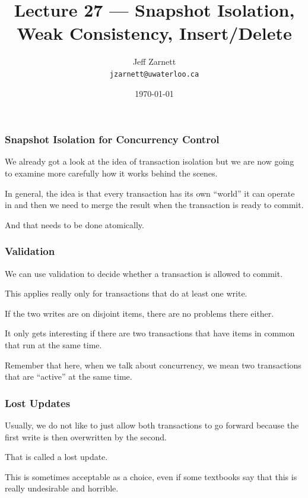 

\title{Lecture  27 --- Snapshot Isolation, Weak Consistency, Insert/Delete}

\author{Jeff Zarnett \\ \small \texttt{jzarnett@uwaterloo.ca}}
\date{\today}




\begin{frame}
  \titlepage

 \end{frame}



\begin{frame}
\frametitle{Snapshot Isolation for Concurrency Control}

We already got a look at the idea of transaction isolation but we are now going to examine more carefully how it works behind the scenes. 

In general, the idea is that every transaction has its own ``world'' it can operate in and then we need to merge the result when the transaction is ready to commit. 

And that needs to be done atomically.


\end{frame}

\begin{frame}
\frametitle{Validation}
We can use validation to decide whether a transaction is allowed to commit. 

This applies really only for transactions that do at least one write. 

If the two writes are on disjoint items, there are no problems there either. 

It only gets interesting if there are two transactions that have items in common that run at the same time. 

Remember that here, when we talk about concurrency, we mean two transactions that are ``active'' at the same time.

\end{frame}

\begin{frame}
\frametitle{Lost Updates}
Usually, we do not like to just allow both transactions to go forward because the first write is then overwritten by the second.

That is called a \alert{lost update}. 

This is sometimes  acceptable as a choice, even if some textbooks say that this is really undesirable and horrible.


\end{frame}


